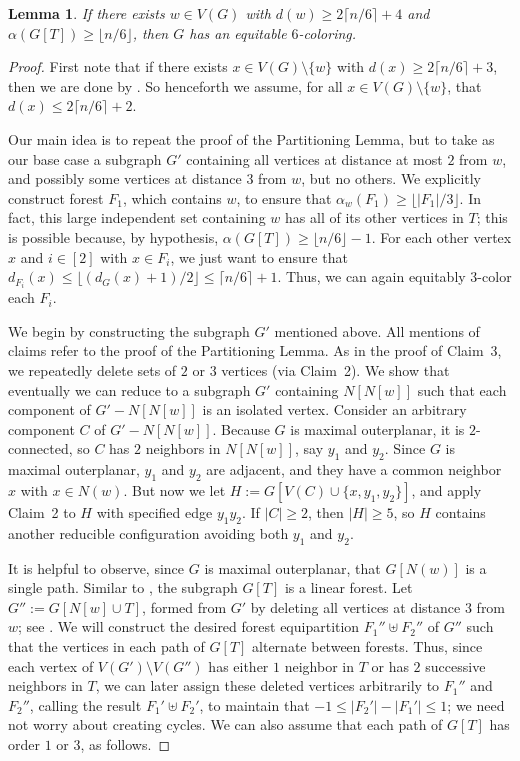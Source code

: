 \documentclass[11pt]{article}
\newtheorem{lem}{Lemma}
\theoremstyle{definition}
\newcommand\floor[1]{\lfloor#1\rfloor}
\newcommand\ceil[1]{\lceil#1\rceil}
\renewcommand\ge\geqslant
\renewcommand\le\leqslant
\begin{document}
\begin{lem}
	If there exists $w\in V(G)$ with $d(w)\ge 2\ceil{n/6}+4$ and $\alpha(G[T])\ge \floor{n/6}$, then $G$ has an equitable $6$-coloring.
\end{lem}
\begin{proof}
	First note that if there exists $x\in V(G)\setminus\{w\}$ with $d(x)\ge 2\ceil{n/6}+3$, then we are done by .
	So henceforth we assume, for all $x\in V(G)\setminus\{w\}$, that $d(x)\le 2\ceil{n/6}+2$.

	Our main idea is to repeat the proof of the Partitioning Lemma, but to take as our base case a subgraph $G'$ containing all vertices at 
	distance at most $2$ from $w$, and possibly some vertices at distance $3$ from $w$, but no others.  We explicitly construct
	forest $F_1$, which contains $w$, to ensure that $\alpha_w(F_1)\ge \floor{|F_1|/3}$.  In fact, this large independent set containing $w$ has all
	of its other vertices in $T$; this is possible because, by hypothesis, $\alpha(G[T])\ge \floor{n/6}-1$.
	For each other vertex $x$ and $i\in[2]$ with $x\in F_i$, we just want to ensure that $d_{F_i}(x)\le \floor{(d_G(x)+1)/2}\le \ceil{n/6}+1$.
	Thus, we can again equitably $3$-color each $F_i$.
	
	We begin by constructing the subgraph $G'$ mentioned above.  All mentions of claims refer to the proof of the Partitioning Lemma.
	As in the proof of Claim~3, we repeatedly delete sets of $2$ or $3$ vertices 
	(via Claim~2).  We show that eventually we can reduce to a subgraph $G'$ containing $N[N[w]]$ such that each component of $G'-N[N[w]]$ is an
	isolated vertex.  Consider an arbitrary component $C$ of $G'-N[N[w]]$.  Because $G$ is maximal outerplanar, it is $2$-connected, so $C$ has $2$
	neighbors in $N[N[w]]$, say $y_1$ and $y_2$.  Since $G$ is maximal outerplanar, $y_1$ and $y_2$ are adjacent, and they have a common neighbor 
	$x$ with $x\in N(w)$.  But now we let $H:=G[V(C)\cup\{x,y_1,y_2\}]$, and apply Claim~2 to $H$ with specified edge $y_1y_2$.  If $|C|\ge 2$, then
	$|H|\ge 5$, so $H$ contains another reducible configuration avoiding both $y_1$ and $y_2$. 

	It is helpful to observe, since $G$ is maximal outerplanar, that $G[N(w)]$ is a single path.  Similar to , the subgraph $G[T]$ 
	is a linear forest.  Let $G'':=G[N[w]\cup T]$, formed from $G'$ by deleting all vertices at distance $3$ from $w$; see .  We will construct the desired
	forest equipartition $F_1''\uplus F_2''$ of $G''$ such that the vertices in each path of $G[T]$ alternate between forests.  Thus, since
	each vertex of $V(G')\setminus V(G'')$ has either $1$ neighbor in $T$ or has $2$ successive neighbors in $T$, we can later assign these deleted 
	vertices arbitrarily to $F_1''$ and $F_2''$, calling the result $F_1'\uplus F_2'$, to maintain that $-1\le |F_2'|-|F_1'|\le 1$; we need not worry 
	about creating cycles.  We can also assume that each path of $G[T]$ has order $1$ or $3$, as follows.


\end{proof}
\end{document}
